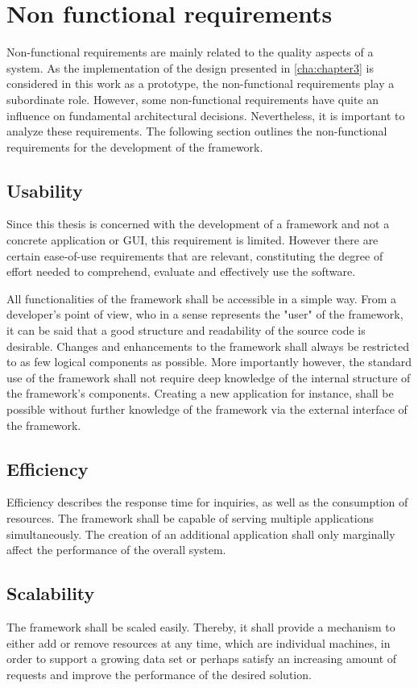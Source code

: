 \section{Non functional requirements\label{sec:req_nf_req}}
Non-functional requirements are mainly related to the quality aspects of a system. As the implementation of the design presented in \ref{cha:chapter3} is considered in this work as a prototype, the non-functional requirements play a subordinate role. However, some non-functional requirements have quite an influence on fundamental architectural decisions. Nevertheless, it is important to analyze these requirements. The following section outlines the non-functional requirements for the development of the framework.

\subsection{Usability}
Since this thesis is concerned with the development of a framework and not a concrete application or \ac{GUI}, this requirement is limited. However there are certain ease-of-use requirements  that are relevant, constituting the degree of effort needed to comprehend, evaluate and effectively use the software.  


All functionalities of the framework shall be accessible in a simple way. From a developer's point of view, who in a sense represents the "user" of the framework, it can be said that a good structure and readability of the source code is desirable. Changes and enhancements to the framework shall always be restricted to as few logical components as possible. More importantly however, the standard use of the framework shall not require deep knowledge of the internal structure of the framework's components. Creating a new application for instance, shall be possible without further knowledge of the framework via the external interface of the framework.


\subsection{Efficiency}
Efficiency describes the response time for inquiries, as well as the consumption of resources. The framework shall be capable of serving multiple applications simultaneously. The creation of an additional application shall only marginally affect the performance of the overall system.

\subsection{Scalability}
The framework shall be scaled easily. Thereby, it shall provide a mechanism to either add or remove resources at any time, which are individual machines, in order to support a growing data set or perhaps satisfy an increasing amount of requests and improve the performance of the desired solution.
